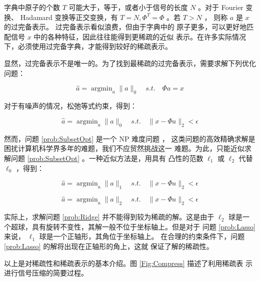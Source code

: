 字典中原子的个数 $T$ 可能大于，等于，或者小于信号的长度 $N$ 。对于 Fourier
变换、 Hadamard 变换等正交变换，有 $T = N, \Phi^T = \Phi$ 。若 $T > N$ ，
则称 $a$ 是 $x$ 的过完备表示。 过完备表示看似浪费，但由于字典中的
原子更多，可以更好地匹配信号 $x$ 中的各种特征，因此往往能得到更稀疏的近似
表示。在许多实际情况下，必须使用过完备字典，才能得到较好的稀疏表示。

显然，过完备表示不是唯一的。为了找到最稀疏的过完备表示，需要求解下列优化
问题：
\begin{problem}
\begin{equation}
\hat a = \mathop{\arg\min}_a \|a\|_0 \quad s.t. \quad \Phi a = x
\end{equation}
\end{problem}
对于有噪声的情况，松弛等式约束，得到：
\begin{problem}[稀疏逼近问题] \label{prob:SubsetOpt}
\begin{equation}
\hat a = \mathop{\arg\min}_a  \|a\|_0 \quad s.t. \quad \|x - \Phi a\|_2 < \epsilon
\end{equation}
\end{problem}
然而，问题 \ref{prob:SubsetOpt} 是一个 NP 难度问题 \cite{GJ79, SubsetOptNPC}，
这类问题的高效精确求解是困扰计算机科学界多年的难题，我们不应贸然挑战这一
难题。为此，只能近似求解问题 \ref{prob:SubsetOpt} 。一种近似方法是，用具有
凸性的范数 $\ell_1$ 或 $\ell_2$ 代替 $\ell_0$ ，得到：
\begin{problem} \label{prob:Lasso}
\begin{equation} \label{eqn:Lasso}
\hat a = \mathop{\arg\min}_a \|a\|_1 \quad s.t. \quad \|x - \Phi a\|_2 < \epsilon
\end{equation}
\end{problem}
\begin{problem}[岭回归问题] \label{prob:Ridge}
\begin{equation}
\hat a = \mathop{\arg\min}_a \|a\|_2 \quad s.t. \quad \|x - \Phi a\|_2 < \epsilon
\end{equation}
\end{problem}
实际上，求解问题 \ref{prob:Ridge} 并不能得到较为稀疏的解。这是由于
$\ell_2$ 球是一个超球，具有旋转不变性，其解一般不位于坐标轴上。但是对于
问题 \ref{prob:Lasso} 来说， $\ell_1$ 球是一个正轴形，其角位于坐标轴上。
在合理的约束条件下，问题 \ref{prob:Lasso} 的解将出现在正轴形的角上，这就
保证了解的稀疏性。

以上是对稀疏性和稀疏表示的基本介绍。图 \ref{Fig:Compress} 描述了利用稀疏表
示进行信号压缩的简要过程。


